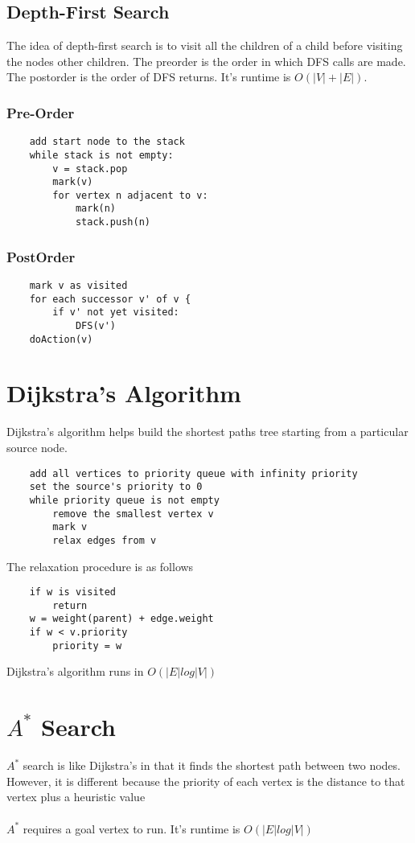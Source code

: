 \documentclass{article}
\begin{document}
\subsection{Depth-First Search}
The idea of depth-first search is to visit all the children of a child before visiting the nodes other children.
The preorder is the order in which DFS calls are made. The postorder is the order of DFS returns.
It's runtime is $O(|V|+|E|)$.
\subsubsection{Pre-Order}
\begin{lstlisting}
    add start node to the stack
    while stack is not empty:
        v = stack.pop
        mark(v)
        for vertex n adjacent to v:
            mark(n)
            stack.push(n)
\end{lstlisting}
\subsubsection{PostOrder}
\begin{lstlisting}
    mark v as visited
    for each successor v' of v {
        if v' not yet visited:
            DFS(v')
    doAction(v)
\end{lstlisting}
\section{Dijkstra's Algorithm}
Dijkstra's algorithm helps build the shortest paths tree starting from a particular source node.
\begin{lstlisting}
    add all vertices to priority queue with infinity priority
    set the source's priority to 0
    while priority queue is not empty
        remove the smallest vertex v
        mark v 
        relax edges from v
\end{lstlisting}
The relaxation procedure is as follows
\begin{lstlisting}
    if w is visited
        return
    w = weight(parent) + edge.weight
    if w < v.priority
        priority = w
\end{lstlisting}
Dijkstra's algorithm runs in $O(|E|log|V|)$
\section{$A^*$ Search}
$A^*$ search is like Dijkstra's in that it finds the shortest path between two nodes.
However, it is different because the priority of each vertex is the distance to that vertex plus a heuristic value
\\\\
$A^*$ requires a goal vertex to run. It's runtime is $O(|E|log|V|)$
\end{document}
